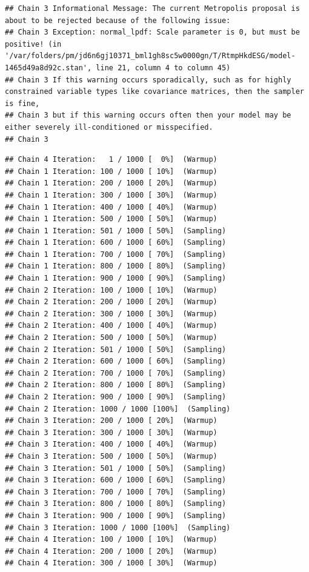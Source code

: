 \documentclass[
]{article}
\begin{document}
\begin{verbatim}
## Chain 3 Informational Message: The current Metropolis proposal is about to be rejected because of the following issue:
## Chain 3 Exception: normal_lpdf: Scale parameter is 0, but must be positive! (in '/var/folders/pm/jd6n6gj10371_bml1gh8sc5w0000gn/T/RtmpHkdESG/model-1465d49a8d92c.stan', line 21, column 4 to column 45)
## Chain 3 If this warning occurs sporadically, such as for highly constrained variable types like covariance matrices, then the sampler is fine,
## Chain 3 but if this warning occurs often then your model may be either severely ill-conditioned or misspecified.
## Chain 3
\end{verbatim}

\begin{verbatim}
## Chain 4 Iteration:   1 / 1000 [  0%]  (Warmup) 
## Chain 1 Iteration: 100 / 1000 [ 10%]  (Warmup) 
## Chain 1 Iteration: 200 / 1000 [ 20%]  (Warmup) 
## Chain 1 Iteration: 300 / 1000 [ 30%]  (Warmup) 
## Chain 1 Iteration: 400 / 1000 [ 40%]  (Warmup) 
## Chain 1 Iteration: 500 / 1000 [ 50%]  (Warmup) 
## Chain 1 Iteration: 501 / 1000 [ 50%]  (Sampling) 
## Chain 1 Iteration: 600 / 1000 [ 60%]  (Sampling) 
## Chain 1 Iteration: 700 / 1000 [ 70%]  (Sampling) 
## Chain 1 Iteration: 800 / 1000 [ 80%]  (Sampling) 
## Chain 1 Iteration: 900 / 1000 [ 90%]  (Sampling) 
## Chain 2 Iteration: 100 / 1000 [ 10%]  (Warmup) 
## Chain 2 Iteration: 200 / 1000 [ 20%]  (Warmup) 
## Chain 2 Iteration: 300 / 1000 [ 30%]  (Warmup) 
## Chain 2 Iteration: 400 / 1000 [ 40%]  (Warmup) 
## Chain 2 Iteration: 500 / 1000 [ 50%]  (Warmup) 
## Chain 2 Iteration: 501 / 1000 [ 50%]  (Sampling) 
## Chain 2 Iteration: 600 / 1000 [ 60%]  (Sampling) 
## Chain 2 Iteration: 700 / 1000 [ 70%]  (Sampling) 
## Chain 2 Iteration: 800 / 1000 [ 80%]  (Sampling) 
## Chain 2 Iteration: 900 / 1000 [ 90%]  (Sampling) 
## Chain 2 Iteration: 1000 / 1000 [100%]  (Sampling) 
## Chain 3 Iteration: 200 / 1000 [ 20%]  (Warmup) 
## Chain 3 Iteration: 300 / 1000 [ 30%]  (Warmup) 
## Chain 3 Iteration: 400 / 1000 [ 40%]  (Warmup) 
## Chain 3 Iteration: 500 / 1000 [ 50%]  (Warmup) 
## Chain 3 Iteration: 501 / 1000 [ 50%]  (Sampling) 
## Chain 3 Iteration: 600 / 1000 [ 60%]  (Sampling) 
## Chain 3 Iteration: 700 / 1000 [ 70%]  (Sampling) 
## Chain 3 Iteration: 800 / 1000 [ 80%]  (Sampling) 
## Chain 3 Iteration: 900 / 1000 [ 90%]  (Sampling) 
## Chain 3 Iteration: 1000 / 1000 [100%]  (Sampling) 
## Chain 4 Iteration: 100 / 1000 [ 10%]  (Warmup) 
## Chain 4 Iteration: 200 / 1000 [ 20%]  (Warmup) 
## Chain 4 Iteration: 300 / 1000 [ 30%]  (Warmup) 

\end{verbatim}
\end{document}
